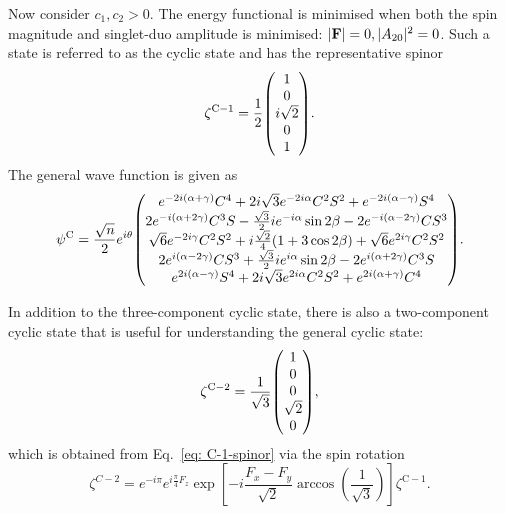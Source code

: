 Now consider \(c_1, c_2 > 0\).
The energy functional is minimised when both the spin magnitude and singlet-duo
amplitude is minimised: \(|\vb{F}| = 0, |A_{20}|^2=0\).
Such a state is referred to as the cyclic state and has the representative
spinor
\begin{equation}
    \zeta^\mathrm{C-1} = \frac{1}{2}\mqty(1 \\ 0 \\ i\sqrt{2} \\ 0 \\ 1).
    \label{eq: C-1-spinor}
\end{equation}
The general wave function is given as
\begin{equation}
    \psi^\mathrm{C} = \frac{\sqrt{n}}{2}e^{i\theta} \mqty(
    e^{-2i(\alpha+\gamma)}C^4 + 2i\sqrt{3}e^{-2i\alpha}C^2S^2
    + e^{-2i(\alpha-\gamma)}S^4
    \\
    2e^{-i(\alpha+2\gamma)}C^3S - \frac{\sqrt{3}}{2}ie^{-i\alpha}\sin 2\beta
    - 2e^{-i(\alpha-2\gamma)}CS^3
    \\
    \sqrt{6}e^{-2i\gamma}C^2S^2 + i\frac{\sqrt{2}}{4}(1+3\cos 2\beta)
    + \sqrt{6}e^{2i\gamma}C^2S^2
    \\
    2e^{i(\alpha-2\gamma)}CS^3 + \frac{\sqrt{3}}{2}ie^{i\alpha}\sin 2\beta
    - 2e^{i(\alpha+2\gamma)}C^3S
    \\
    e^{2i(\alpha-\gamma)}S^4 + 2i\sqrt{3}e^{2i\alpha}C^2S^2
    + e^{2i(\alpha+\gamma)}C^4
    ).
\end{equation}

In addition to the three-component cyclic state, there is also a two-component
cyclic state that is useful for understanding the general cyclic state:
\begin{equation}
    \zeta^\mathrm{C-2} = \frac{1}{\sqrt{3}}\mqty(1  \\ 0 \\ 0 \\ \sqrt{2} \\ 0),
    \label{eq: C-2-spinor}
\end{equation}
which is obtained from Eq.~\eqref{eq: C-1-spinor} via the spin rotation
\begin{equation}
    \zeta^{C-2} = e^{-i\pi}e^{i\frac{\pi}{4}F_z}
    \exp\left[-i\frac{F_x-F_y}{\sqrt{2}}
        \arccos{\left(\frac{1}{\sqrt{3}}\right)}\right]\zeta^\mathrm{C-1}.
\end{equation}

